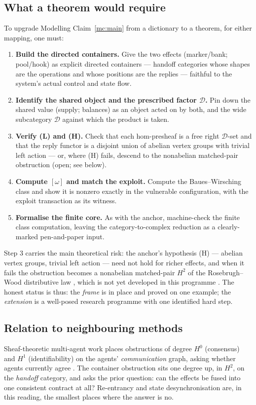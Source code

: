 \documentclass[11pt]{amsart}
\theoremstyle{definition}
\theoremstyle{remark}
\newcommand{\D}{\mathcal{D}}
\begin{document}
\subsection*{What a theorem would require}
To upgrade Modelling Claim~\ref{mc:main} from a dictionary to a theorem, for either mapping, one must:
\begin{enumerate}[leftmargin=2em]
\item \textbf{Build the directed containers.} Give the two effects (marker/bank; pool/hook) as
  explicit directed containers --- handoff categories whose shapes are the operations and whose
  positions are the replies --- faithful to the system's actual control and state flow.
\item \textbf{Identify the shared object and the prescribed factor $\D$.} Pin down the shared value
  (supply; balances) as an object acted on by both, and the wide subcategory $\D$ against which the
  product is taken.
\item \textbf{Verify (L) and (H).} Check that each hom-presheaf is a free right $\D$-set and that
  the reply functor is a disjoint union of abelian vertex groups with trivial left action --- or,
  where (H) fails, descend to the nonabelian matched-pair obstruction (open; see below).
\item \textbf{Compute $[\omega]$ and match the exploit.} Compute the Baues--Wirsching class and show
  it is nonzero exactly in the vulnerable configuration, with the exploit transaction as its witness.
\item \textbf{Formalise the finite core.} As with the anchor, machine-check the finite class
  computation, leaving the category-to-complex reduction as a clearly-marked pen-and-paper input.
\end{enumerate}
Step 3 carries the main theoretical risk: the anchor's hypothesis (H) --- abelian vertex groups,
trivial left action --- need not hold for richer effects, and when it fails the obstruction becomes a
nonabelian matched-pair $H^2$ of the Rosebrugh--Wood distributive law \cite{RosebrughWood}, which is
not yet developed in this programme \cite{gobstr}. The honest status is thus: the \emph{frame} is in
place and proved on one example; the \emph{extension} is a well-posed research programme with one
identified hard step.

\subsection*{Relation to neighbouring methods}
Sheaf-theoretic multi-agent work places obstructions of degree $H^0$ (consensus) and $H^1$
(identifiability) on the agents' \emph{communication} graph, asking whether agents currently agree
\cite{sheafMAS}. The container obstruction sits one degree up, in $H^2$, on the \emph{handoff}
category, and asks the prior question: can the effects be fused into one consistent contract at all?
Re-entrancy and state desynchronisation are, in this reading, the smallest places where the answer
is no.
\end{document}
